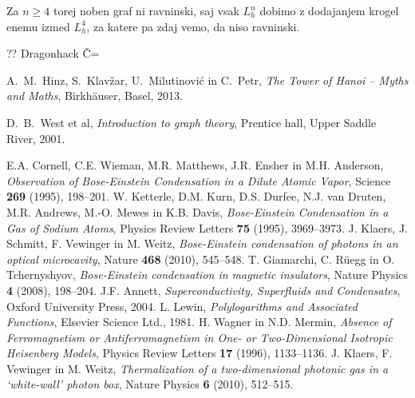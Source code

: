\documentclass[twoside,11pt]{article}
\begin{document}
Za $n \geq 4$ torej noben graf ni ravninski, saj vsak $L_h^n$ dobimo z dodajanjem krogel enemu izmed $L_h^4$, za katere pa zdaj vemo, da niso ravninski.
\endproof

?? Dragonhack Č=


\begin{thebibliography}{99}
 A.\ M.\ Hinz, S.\ Klavžar, U.\ Milutinović in C.\ Petr, \emph{The Tower of Hanoi – Myths and Maths}, Birkhäuser, Basel, 2013.

 D.\ B.\ West et al, \emph{Introduction to graph theory}, Prentice hall, Upper Saddle River, 2001.

%
%
%

 E.A. Cornell, C.E. Wieman, M.R. Matthews, J.R. Ensher in M.H. Anderson, \emph{Observation of Bose-Einstein Condensation in a Dilute Atomic Vapor}, Science \textbf{269} (1995), 198--201. 
 W. Ketterle, D.M. Kurn, D.S. Durfee, N.J. van Druten, M.R. Andrews, M.-O. Mewes in K.B. Davis, \emph{Bose-Einstein Condensation in a Gas of Sodium Atoms}, Physics Review Letters \textbf{75} (1995), 3969--3973. 
 J. Klaers, J. Schmitt, F. Vewinger in M. Weitz, \emph{Bose-Einstein condensation of photons in an optical microcavity}, Nature \textbf{468} (2010), 545--548. 
 T. Giamarchi, C. R\"uegg in O. Tchernyshyov, \emph{Bose-Einstein condensation in magnetic insulators}, Nature Physics \textbf{4} (2008), 198--204. 
 J.F. Annett, \emph{Superconductivity, Superfluids and Condensates}, Oxford University Press, 2004.
 L. Lewin, \emph{Polylogarithms and Associated Functions}, Elsevier Science Ltd., 1981. 
 H. Wagner in N.D. Mermin, \emph{Absence of Ferromagnetism or Antiferromagnetism in One- or Two-Dimensional Isotropic Heisenberg Models}, Physics Review Letters  \textbf{17} (1996), 1133--1136.
 J. Klaers, F. Vewinger in M. Weitz, \emph{Thermalization of a two-dimensional photonic gas in a ‘white-wall’ photon box}, Nature Physics \textbf{6} (2010), 512--515.

\end{thebibliography}
\end{document}
